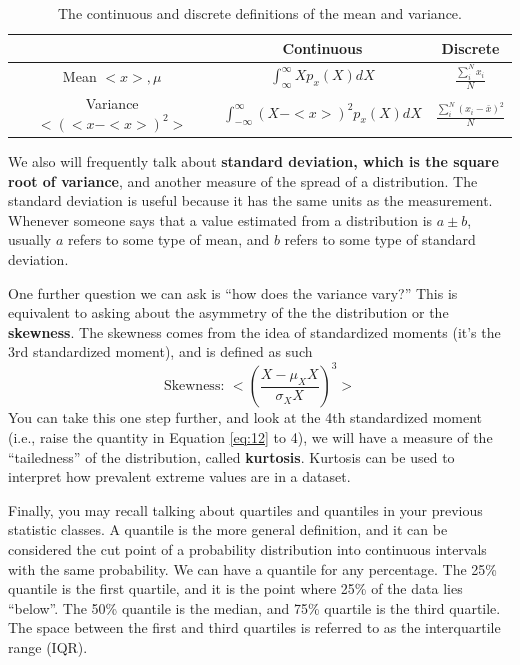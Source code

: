 \documentclass{article}
\begin{document}
\begin{table}[h!]
  \centering
  \begin{tabular}{|c||c|c|}
    
    \hline
    & Continuous & Discrete \\
    \hline
    Mean $<x>, \mu$ & $\int^\infty_\infty X p_x(X)dX$ & $\frac{\sum_i^N x_i}{N}$ \\[0.75ex] 
    \hline
    Variance $<(<x-<x>)^2>$ & $\int^{\infty}_{-\infty}(X - <x>)^2 p_x(X) dX$ & $\frac{\sum_i^{N} (x_i-\bar{x})^2}{N}$\\[0.75ex]
    \hline
  \end{tabular}
  
  \caption{The continuous and discrete definitions of the mean and variance.}
  \label{table:1}
\end{table}

We also will frequently talk about \textbf{standard deviation, which is the square root of variance}, and another measure of the spread of a distribution. The standard deviation is useful because it has the same units as the measurement. Whenever someone says that a value estimated from a distribution is $a \pm b$, usually $a$ refers to some type of mean, and $b$ refers to some type of standard deviation. 

One further question we can ask is ``how does the variance vary?'' This is equivalent to asking about the asymmetry of the the distribution or the \textbf{skewness}. The skewness comes from the idea of standardized moments (it's the 3rd standardized moment), and is defined as such
\begin{equation}
\label{eq:12}
\text{Skewness: } <\left(\frac{X - \mu_XX}{\sigma_XX}\right)^{3}>
\end{equation}
You can take this one step further, and look at the 4th standardized moment (i.e., raise the quantity in Equation \ref{eq:12} to 4), we will have a measure of the ``tailedness'' of the distribution, called \textbf{kurtosis}. Kurtosis can be used to interpret how prevalent extreme values are in a dataset. 

Finally, you may recall talking about quartiles and quantiles in your previous statistic classes. A quantile is the more general definition, and it can be considered the cut point of a probability distribution into continuous intervals with the same probability. We can have a quantile for any percentage. The 25\% quantile is the first quartile, and it is the point where 25\% of the data lies ``below''. The 50\% quantile is the median, and 75\% quartile is the third quartile. The space between the first and third quartiles is referred to as the interquartile range (IQR). 
\end{document}
